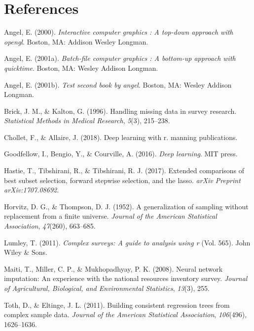 \documentclass[12pt,twoside]{reedthesis}
\begin{document}
\backmatter

\chapter*{References}\label{references}


\noindent

\setlength{\parindent}{-0.20in} \setlength{\leftskip}{0.20in}
\setlength{\parskip}{8pt}

\hypertarget{refs}{}
\hypertarget{ref-angel2000}{}
Angel, E. (2000). \emph{Interactive computer graphics : A top-down
approach with opengl}. Boston, MA: Addison Wesley Longman.

\hypertarget{ref-angel2001}{}
Angel, E. (2001a). \emph{Batch-file computer graphics : A bottom-up
approach with quicktime}. Boston, MA: Wesley Addison Longman.

\hypertarget{ref-angel2002a}{}
Angel, E. (2001b). \emph{Test second book by angel}. Boston, MA: Wesley
Addison Longman.

\hypertarget{ref-brick1996handling}{}
Brick, J. M., \& Kalton, G. (1996). Handling missing data in survey
research. \emph{Statistical Methods in Medical Research}, \emph{5}(3),
215--238.

\hypertarget{ref-chollet2018deep}{}
Chollet, F., \& Allaire, J. (2018). Deep learning with r. manning
publications.

\hypertarget{ref-goodfellow2016deep}{}
Goodfellow, I., Bengio, Y., \& Courville, A. (2016). \emph{Deep
learning}. MIT press.

\hypertarget{ref-hastie2017extended}{}
Hastie, T., Tibshirani, R., \& Tibshirani, R. J. (2017). Extended
comparisons of best subset selection, forward stepwise selection, and
the lasso. \emph{arXiv Preprint arXiv:1707.08692}.

\hypertarget{ref-horvitz1952generalization}{}
Horvitz, D. G., \& Thompson, D. J. (1952). A generalization of sampling
without replacement from a finite universe. \emph{Journal of the
American Statistical Association}, \emph{47}(260), 663--685.

\hypertarget{ref-lumley2011complex}{}
Lumley, T. (2011). \emph{Complex surveys: A guide to analysis using r}
(Vol. 565). John Wiley \& Sons.

\hypertarget{ref-maiti2008neural}{}
Maiti, T., Miller, C. P., \& Mukhopadhyay, P. K. (2008). Neural network
imputation: An experience with the national resources inventory survey.
\emph{Journal of Agricultural, Biological, and Environmental
Statistics}, \emph{13}(3), 255.

\hypertarget{ref-toth2011building}{}
Toth, D., \& Eltinge, J. L. (2011). Building consistent regression trees
from complex sample data. \emph{Journal of the American Statistical
Association}, \emph{106}(496), 1626--1636.


\end{document}
